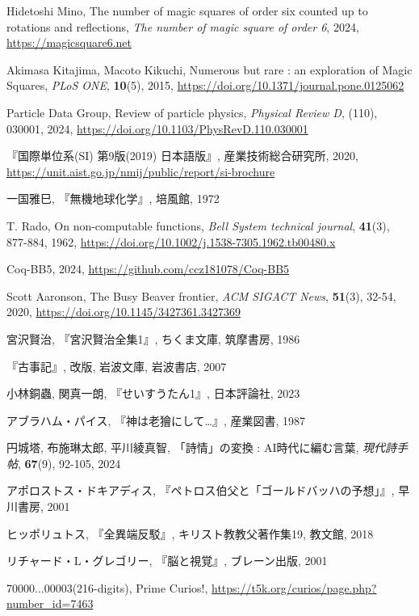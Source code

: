 \documentclass[10pt, a5paper, twoside]{jsarticle}
\theoremstyle{definition}
\begin{document}
\begin{thebibliography}{99}
		 Hidetoshi Mino, The number of magic squares of order six counted up to rotations and reflections, \textit{The number of magic square of order 6}, 2024, \url{https://magicsquare6.net}

		 Akimasa Kitajima, Macoto Kikuchi, Numerous but rare : an exploration of Magic Squares, \textit{PLoS ONE}, \textbf{10}(5), 2015, \url{https://doi.org/10.1371/journal.pone.0125062}

		 Particle Data Group, Review of particle physics, \textit{Physical Review D}, (110), 030001, 2024, \url{https://doi.org/10.1103/PhysRevD.110.030001}

		 『国際単位系(SI) 第9版(2019) 日本語版』, 産業技術総合研究所, 2020, \url{https://unit.aist.go.jp/nmij/public/report/si-brochure}

		 一国雅巳, 『無機地球化学』, 培風館, 1972

		 T. Rado, On non-computable functions, \textit{Bell System technical journal}, \textbf{41}(3), 877-884, 1962, \url{https://doi.org/10.1002/j.1538-7305.1962.tb00480.x}

		 Coq-BB5, 2024, \url{https://github.com/ccz181078/Coq-BB5}

		 Scott Aaronson, The Busy Beaver frontier, \textit{ACM SIGACT News}, \textbf{51}(3), 32-54, 2020, \url{https://doi.org/10.1145/3427361.3427369}

		 宮沢賢治, 『宮沢賢治全集1』, ちくま文庫, 筑摩書房, 1986

		 『古事記』, 改版, 岩波文庫, 岩波書店, 2007

		 小林銅蟲, 関真一朗, 『せいすうたん1』, 日本評論社, 2023

		 アブラハム・パイス, 『神は老獪にして…』, 産業図書, 1987

		 円城塔, 布施琳太郎, 平川綾真智, 「詩情」の変換 : AI時代に編む言葉, \textit{現代詩手帖}, \textbf{67}(9), 92-105, 2024

		 アポロストス・ドキアディス, 『ペトロス伯父と「ゴールドバッハの予想」』, 早川書房, 2001

		 ヒッポリュトス, 『全異端反駁』, キリスト教教父著作集19, 教文館, 2018

		 リチャード・L・グレゴリー, 『脳と視覚』, ブレーン出版, 2001

		 70000...00003(216-digits), Prime Curios!, \url{https://t5k.org/curios/page.php?number_id=7463}


\end{thebibliography}
\end{document}
